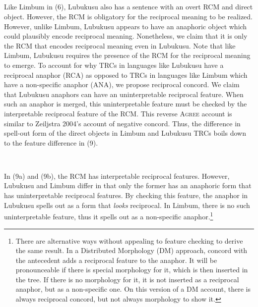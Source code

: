 \documentclass[output=paper]{langsci/langscibook}
\begin{document}
\setcounter{listWWviiiNumxlileveli}{0}
\begin{listWWviiiNumxlileveli}
\item \ea\label{ex:}
\\
\ea\label{ex:}
\\
\ea\label{ex:}
\\
\ea\label{ex:}
\\
\end{listWWviiiNumxlileveli}

Like Limbum in (6), Lubukusu also has a sentence with an overt RCM and direct object. However, the RCM is obligatory for the reciprocal meaning to be realized. However, unlike Limbum, Lubukusu appears to have an anaphoric object which could plausibly encode reciprocal meaning. Nonetheless, we claim that it is only the RCM that encodes reciprocal meaning even in Lubukusu. Note that like Limbum, Lubukusu requires the presence of the RCM for the reciprocal meaning to emerge. To account for why TRCs in languages like Lubukusu have a reciprocal anaphor (RCA) as opposed to TRCs in languages like Limbum which have a non-specific anaphor (ANA), we propose reciprocal concord. We claim that Lubukusu anaphors can have an uninterpretable reciprocal feature. When such an anaphor is merged, this uninterpretable feature must be checked by the interpretable reciprocal feature of the RCM. This reverse \textsc{Agree} account is similar to Zeiljstra 2004's account of negative concord. Thus, the difference in spell-out form of the direct objects in Limbum and Lubukusu TRCs boils down to the feature difference in (9).

\begin{listWWviiiNumxlileveli}
\item \ea\label{ex:}
\\
\end{listWWviiiNumxlileveli}

In (9a) and (9b), the RCM has interpretable reciprocal features. However, Lubukusu and Limbum differ in that only the former has an anaphoric form that has uninterpretable reciprocal features. By checking this feature, the anaphor in Lubukusu spells out as a form that \textit{looks} reciprocal. In Limbum, there is no such uninterpretable feature, thus it spells out as a non-specific anaphor.\footnote{ There are alternative ways without appealing to feature checking to derive the same result. In a Distributed Morphology (DM) approach, concord with the antecedent adds a reciprocal feature to the anaphor. It will be pronounceable if there is special morphology for it, which is then inserted in the tree. If there is no morphology for it, it is not inserted as a reciprocal anaphor, but as a non-specific one. On this version of a DM account, there is always reciprocal concord, but not always morphology to show it. }
\end{document}
